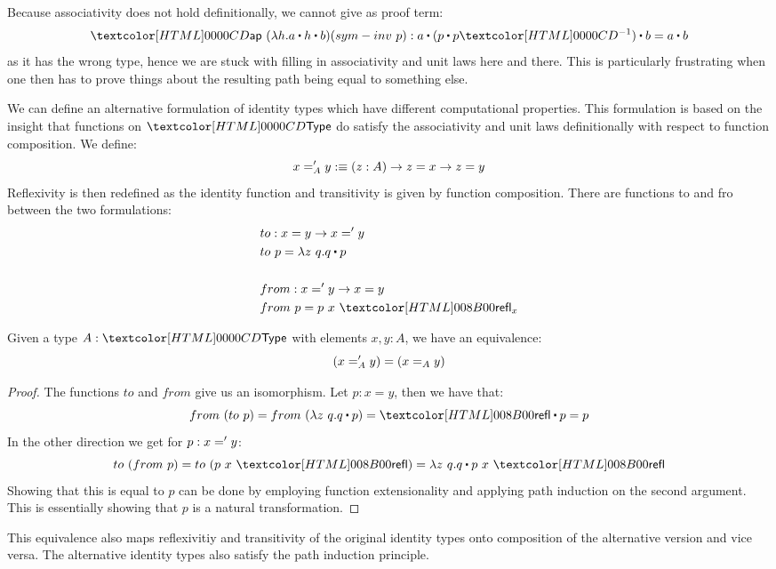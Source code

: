Because associativity does not hold definitionally, we cannot give as
proof term:
$$
\ap\ (\lambda h . a \ct h \ct b) (sym-inv\ p) : a \ct (p \ct \sym{p}) \ct b = a \ct b
$$
as it has the wrong type, hence we are stuck with filling in
associativity and unit laws here and there. This is particularly
frustrating when one then has to prove things about the resulting path
being equal to something else.

We can define an alternative formulation of identity types which have
different computational properties. This formulation is based on the
insight that functions on $\Type$ do satisfy the associativity and
unit laws definitionally with respect to function composition. We define:
$$
x ='_{A} y :\equiv (z : A) \to z = x \to z = y
$$
Reflexivity is then redefined as the identity function and
transitivity is given by function composition. There are functions to
and fro between the two formulations:
\begin{align*}
  &to : x = y \to x \alteq y \\
  &to\ p = \lambda z\ q . \trans{q}{p} \\
  \\
  &from : x \alteq y \to x = y \\
  &from\ p = p\ x\ \refl_{x}
\end{align*}

\begin{proposition}
  Given a type $A : \Type$ with elements $x, y : A$, we have an equivalence:
  $$
  (x ='_{A} y) = (x =_{A} y)
  $$
\end{proposition}

\begin{proof}
  The functions $to$ and $from$ give us an isomorphism. Let $p : x = y$, then we have that:
  $$
  from\ (to\ p) = from\ (\lambda z\ q . \trans{q}{p}) = \trans{\refl}{p} = p
  $$
  In the other direction we get for $p : x =' y$:
  $$
  to\ (from\ p) = to\ (p\ x\ \refl) = \lambda z\ q . \trans{q}{p\ x\ \refl}
  $$
  Showing that this is equal to $p$ can be done by employing function
  extensionality and applying path induction on the second
  argument. This is essentially showing that $p$ is a natural
  transformation.
\end{proof}

This equivalence also maps reflexivitiy and transitivity of the
original identity types onto composition of the alternative version
and vice versa. The alternative identity types also satisfy the path
induction principle.

